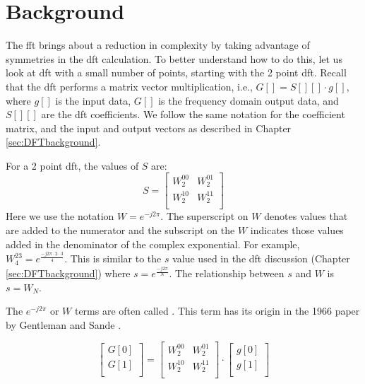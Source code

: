 \section{Background}

The \gls{fft} brings about a reduction in complexity by taking advantage of symmetries in the \gls{dft} calculation. To better understand how to do this, let us look at \gls{dft} with a small number of points, starting with the 2 point \gls{dft}.  Recall that the \gls{dft} performs a matrix vector multiplication, i.e., $G[] = S[][] \cdot g[]$, where $g[]$ is the input data, $G[]$ is the frequency domain output data, and $S[][]$ are the \gls{dft} coefficients. We follow the same notation for the coefficient matrix, and the input and output vectors as described in Chapter \ref{sec:DFTbackground}.

For a 2 point \gls{dft}, the values of $S$ are:
\begin{equation}
S =
 \begin{bmatrix}
  W^{0 0}_2 & W^{0 1}_2  \\
  W^{1 0}_2 & W^{1 1}_2 \\
 \end{bmatrix}
 \end{equation}
Here we use the notation $W = e^{-j 2 \pi}$. The superscript on $W$ denotes values that are added to the numerator and the subscript on the $W$ indicates those values added in the denominator of the complex exponential. For example, $W^{2 3}_4 = e^{\frac{-j 2 \pi \cdot 2 \cdot 3}{4}}$. This is similar to the $s$ value used in the \gls{dft} discussion (Chapter \ref{sec:DFTbackground}) where $s = e^{\frac{-j 2 \pi}{N}}$. The relationship between $s$ and $W$ is $s = W_N$.

\begin{aside}
The $e^{-j 2 \pi}$ or $W$ terms are often called . This term has its origin in the 1966 paper by Gentleman and Sande \cite{gentleman1966fast}.
\end{aside}

\begin{equation}
\begin{bmatrix} 
G[0] \\ 
G[1] \\
\end{bmatrix} = 
 \begin{bmatrix}
  W^{0 0}_2 & W^{0 1}_2  \\
  W^{1 0}_2 & W^{1 1}_2 \\
 \end{bmatrix}
 \cdot
  \begin{bmatrix}
  g[0] \\
  g[1]\\
\end{bmatrix}
\end{equation}

